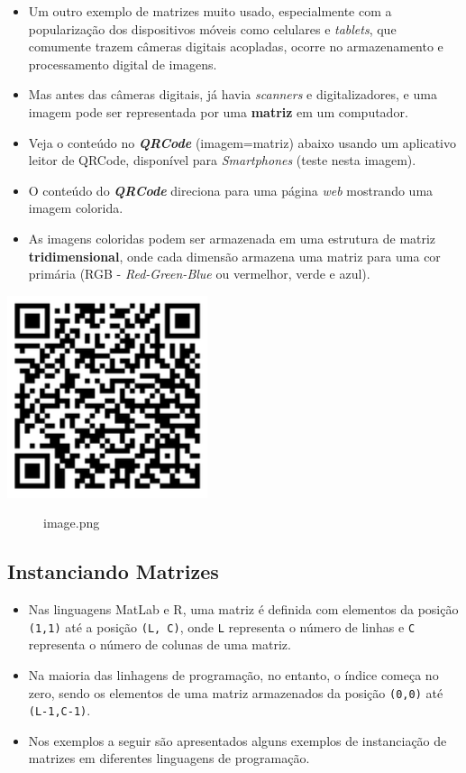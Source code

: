\documentclass[12pt,a4paper]{article}
\begin{document}
    \begin{itemize}
\item
  Um outro exemplo de matrizes muito usado, especialmente com a
  popularização dos dispositivos móveis como celulares e \emph{tablets},
  que comumente trazem câmeras digitais acopladas, ocorre no
  armazenamento e processamento digital de imagens.
\item
  Mas antes das câmeras digitais, já havia \emph{scanners} e
  digitalizadores, e uma imagem pode ser representada por uma
  \textbf{matriz} em um computador.
\item
  Veja o conteúdo no \textbf{\emph{QRCode}} (imagem=matriz) abaixo
  usando um aplicativo leitor de QRCode, disponível para
  \emph{Smartphones} (teste nesta imagem).
\item
  O conteúdo do \textbf{\emph{QRCode}} direciona para uma página
  \emph{web} mostrando uma imagem colorida.
\item
  As imagens coloridas podem ser armazenada em uma estrutura de matriz
  \textbf{tridimensional}, onde cada dimensão armazena uma matriz para
  uma cor primária (RGB - \emph{Red-Green-Blue} ou vermelhor, verde e
  azul).
\end{itemize}

\includegraphics{"figs/image38.png"}

    \begin{figure}
\centering
\caption{image.png}
\end{figure}

    \hypertarget{instanciando-matrizes}{%
\subsection{Instanciando Matrizes}\label{instanciando-matrizes}}

    \begin{itemize}
\item
  Nas linguagens MatLab e R, uma matriz é definida com elementos da
  posição \texttt{(1,1)} até a posição \texttt{(L,\ C)}, onde \texttt{L}
  representa o número de linhas e \texttt{C} representa o número de
  colunas de uma matriz.
\item
  Na maioria das linhagens de programação, no entanto, o índice começa
  no zero, sendo os elementos de uma matriz armazenados da posição
  \texttt{(0,0)} até \texttt{(L-1,C-1)}.
\item
  Nos exemplos a seguir são apresentados alguns exemplos de instanciação
  de matrizes em diferentes linguagens de programação.
\end{itemize}
\end{document}
